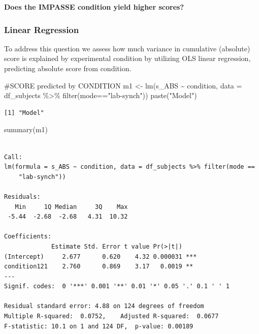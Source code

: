 \documentclass[
  letterpaper,
  DIV=11,
  numbers=noendperiod]{scrreprt}
\newenvironment{Shaded}{\begin{snugshade}}{\end{snugshade}}
\newcommand{\AttributeTok}[1]{\textcolor[rgb]{0.40,0.45,0.13}{#1}}
\newcommand{\CommentTok}[1]{\textcolor[rgb]{0.37,0.37,0.37}{#1}}
\newcommand{\FunctionTok}[1]{\textcolor[rgb]{0.28,0.35,0.67}{#1}}
\newcommand{\NormalTok}[1]{\textcolor[rgb]{0.00,0.23,0.31}{#1}}
\newcommand{\OtherTok}[1]{\textcolor[rgb]{0.00,0.23,0.31}{#1}}
\newcommand{\SpecialCharTok}[1]{\textcolor[rgb]{0.37,0.37,0.37}{#1}}
\newcommand{\StringTok}[1]{\textcolor[rgb]{0.13,0.47,0.30}{#1}}
\begin{document}
\textbf{Does the IMPASSE condition yield higher scores?}

\hypertarget{linear-regression}{%
\subsubsection{Linear Regression}\label{linear-regression}}

To address this question we assess how much variance in cumulative
(absolute) score is explained by experimental condition by utilizing OLS
linear regression, predicting absolute score from condition.

\begin{Shaded}
\begin{Highlighting}[]
\CommentTok{\#SCORE predicted by CONDITION}
\NormalTok{m1 }\OtherTok{\textless{}{-}} \FunctionTok{lm}\NormalTok{(s\_ABS }\SpecialCharTok{\textasciitilde{}}\NormalTok{ condition, }\AttributeTok{data =}\NormalTok{ df\_subjects }\SpecialCharTok{\%\textgreater{}\%} \FunctionTok{filter}\NormalTok{(mode}\SpecialCharTok{==}\StringTok{"lab{-}synch"}\NormalTok{))}
\FunctionTok{paste}\NormalTok{(}\StringTok{"Model"}\NormalTok{)}
\end{Highlighting}
\end{Shaded}

\begin{verbatim}
[1] "Model"
\end{verbatim}

\begin{Shaded}
\begin{Highlighting}[]
\FunctionTok{summary}\NormalTok{(m1)}
\end{Highlighting}
\end{Shaded}

\begin{verbatim}

Call:
lm(formula = s_ABS ~ condition, data = df_subjects %>% filter(mode == 
    "lab-synch"))

Residuals:
   Min     1Q Median     3Q    Max 
 -5.44  -2.68  -2.68   4.31  10.32 

Coefficients:
             Estimate Std. Error t value Pr(>|t|)    
(Intercept)     2.677      0.620    4.32 0.000031 ***
condition121    2.760      0.869    3.17   0.0019 ** 
---
Signif. codes:  0 '***' 0.001 '**' 0.01 '*' 0.05 '.' 0.1 ' ' 1

Residual standard error: 4.88 on 124 degrees of freedom
Multiple R-squared:  0.0752,    Adjusted R-squared:  0.0677 
F-statistic: 10.1 on 1 and 124 DF,  p-value: 0.00189
\end{verbatim}
\end{document}
